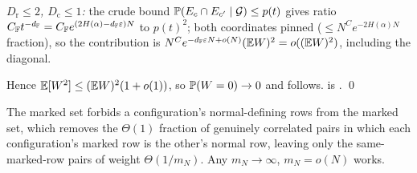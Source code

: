 \emph{$D_{\mathrm r}\le2$, $D_{\mathrm c}\le1$:} the crude bound $\mathbb{P}(E_c\cap E_{c'}\mid\mathcal G)\le p(t)$
gives ratio $C_{\mathbb{F}} t^{-d_{\mathbb{F}}}=C_{\mathbb{F}} e^{(2H(\alpha)-d_{\mathbb{F}}\varepsilon)N}$ to $p(t)^2$; both coordinates pinned
($\le N^Ce^{-2H(\alpha)N}$ fraction), so the contribution is $N^Ce^{-d_{\mathbb{F}}\varepsilon N+o(N)}(\mathbb{E} W)^2=o((\mathbb{E} W)^2)$,
including the diagonal.

Hence $\mathbb{E}[W^2]\le(\mathbb{E} W)^2(1+o(1))$, so $\mathbb{P}(W=0)\to0$ and  follows.
 is . \qed

\begin{remark}\label{rem:marked}
The marked set forbids a configuration's normal-defining rows from the marked set, which removes the
$\Theta(1)$ fraction of genuinely correlated pairs in which each configuration's marked row is the
other's normal row, leaving only the same-marked-row pairs of weight $\Theta(1/m_N)$. Any $m_N\to\infty$,
$m_N=o(N)$ works.
\end{remark}
